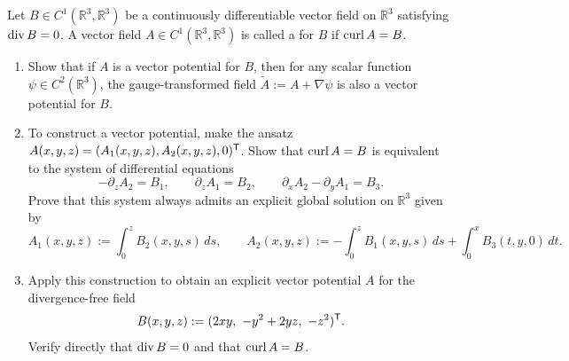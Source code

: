 \begin{exercise}
\label{ex:constructing_vector_potential_divergence_free}
Let $B \in C^1(\mathbb{R}^3, \mathbb{R}^3)$ be a continuously differentiable vector field on
$\mathbb{R}^3$ satisfying $\operatorname{div} B = 0$. A vector field $A \in C^1(\mathbb{R}^3, \mathbb{R}^3)$ is called a
 for $B$ if $\operatorname{curl} A = B$.
\begin{enumerate}[label=\textbf{(\alph*)}]
  \item Show that if $A$ is a vector potential for $B$, then for any scalar function $\psi \in C^2(\mathbb{R}^3)$,
    the gauge-transformed field $\widetilde{A} := A + \nabla \psi$ is also a vector potential for $B$.
  \item To construct a vector potential, make the ansatz $A(x,y,z) = (A_1(x,y,z), A_2(x,y,z), 0)^{\mathsf{T}}$.
    Show that $\operatorname{curl} A = B$ is equivalent to the system of differential equations
    \[
    -\partial_z A_2 = B_1, \qquad \partial_z A_1 = B_2, \qquad \partial_x A_2 - \partial_y A_1 = B_3.
    \]
    Prove that this system always admits an explicit global solution on $\mathbb{R}^3$ given by
    \[
    A_1(x,y,z) := \int_0^z B_2(x,y,s)\,ds, \qquad
    A_2(x,y,z) := -\int_0^z B_1(x,y,s)\,ds + \int_0^x B_3(t,y,0)\,dt.
    \]
  \item Apply this construction to obtain an explicit vector potential $A$ for the divergence-free field
    \[
    B(x,y,z) := (2xy,\ -y^2 + 2yz,\ -z^2)^{\mathsf{T}}.
    \]
    Verify directly that $\operatorname{div} B = 0$ and that $\operatorname{curl} A = B$.
\end{enumerate}
\end{exercise}

